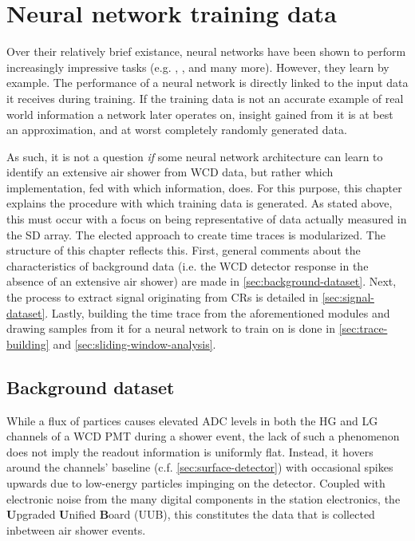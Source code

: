 
\chapter{Neural network training data}
\label{chap:neural-network-data}

Over their relatively brief existance, neural networks have been shown to perform increasingly impressive tasks (e.g.  \cite{openai2019dota}, \cite{openai2023gpt4}, 
and many more). However, they learn by example. The performance of a neural network is directly linked to the input data it receives during training. If the 
training data is not an accurate example of real world information a network later operates on, insight gained from it is at best an approximation, and at worst
completely randomly generated data. 

As such, it is not a question \textit{if} some neural network architecture can learn to identify an extensive air shower from WCD data, but rather which 
implementation, fed with which information, does. For this purpose, this chapter explains the procedure with which training data is generated. As stated above, this
must occur with a focus on being representative of data actually measured in the SD array. The elected approach to create time traces is modularized. The structure
of this chapter reflects this. First, general comments about the characteristics of background data (i.e. the WCD detector response in the absence of an extensive 
air shower) are made in \autoref{sec:background-dataset}. Next, the process to extract signal originating from CRs is detailed in \autoref{sec:signal-dataset}.
Lastly, building the time trace from the aforementioned modules and drawing samples from it for a neural network to train on is done in \autoref{sec:trace-building}
and \autoref{sec:sliding-window-analysis}.

\section{Background dataset}
\label{sec:background-dataset}

While a flux of partices causes elevated ADC levels in both the HG and LG channels of a WCD PMT during a shower event, the lack of such a phenomenon does not imply 
the readout information is uniformly flat. Instead, it hovers around the channels' baseline (c.f. \autoref{sec:surface-detector}) with occasional spikes upwards 
due to low-energy particles impinging on the detector. Coupled with electronic noise from the many digital components in the station electronics, the 
\textbf{U}pgraded \textbf{U}nified \textbf{B}oard (UUB), this constitutes the data that is collected inbetween air shower events.

